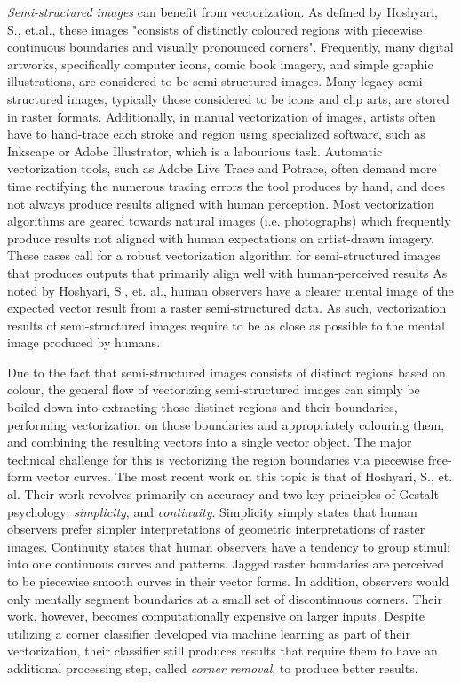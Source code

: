 \documentclass[12pt]{article}
\begin{document}
\textit{Semi-structured images} can benefit from vectorization. As defined by Hoshyari, S., et.al., these images "consists of distinctly coloured regions with piecewise continuous boundaries and visually pronounced corners". Frequently, many digital artworks, specifically computer icons, comic book imagery, and simple graphic illustrations, are considered to be semi-structured images. Many legacy semi-structured images, typically those considered to be icons and clip arts, are stored in raster formats\cite{hoshyari2018perceptiondriven}. Additionally, in manual vectorization of images, artists often have to hand-trace each stroke and region using specialized software, such as Inkscape or Adobe Illustrator, which is a labourious task\cite{matheson2018smoothing}. Automatic vectorization tools, such as Adobe Live Trace and Potrace, often demand more time rectifying the numerous tracing errors the tool produces by hand\cite{matheson2018smoothing}, and does not always produce results aligned with human perception\cite{hoshyari2018perceptiondriven}. Most vectorization algorithms are geared towards natural images (i.e. photographs) which frequently produce results not aligned with human expectations on artist-drawn imagery\cite{hoshyari2018perceptiondriven}. These cases call for a robust vectorization algorithm for semi-structured images that produces outputs that primarily align well with human-perceived results  As noted by Hoshyari, S., et. al., human observers have a clearer mental image of the expected vector result from a raster semi-structured data. As such, vectorization results of semi-structured images require to be as close as possible to the mental image produced by humans\cite{hoshyari2018perceptiondriven}.

Due to the fact that semi-structured images consists of distinct regions based on colour, the general flow of vectorizing semi-structured images can simply be boiled down into extracting those distinct regions and their boundaries, performing vectorization on those boundaries and appropriately colouring them, and combining the resulting vectors into a single vector object. The major technical challenge for this is vectorizing the region boundaries via piecewise free-form vector curves\cite{hoshyari2018perceptiondriven}. The most recent work on this topic is that of Hoshyari, S., et. al. Their work revolves primarily on accuracy and two key principles of Gestalt psychology: \textit{simplicity}, and \textit{continuity}. Simplicity simply states that human observers prefer simpler interpretations of geometric interpretations of raster images. Continuity states that human observers have a tendency to group stimuli into one continuous curves and patterns. Jagged raster boundaries are perceived to be piecewise smooth curves in their vector forms. In addition, observers would only mentally segment boundaries at a small set of discontinuous corners. Their work, however, becomes computationally expensive on larger inputs. Despite utilizing a corner classifier developed via machine learning as part of their vectorization, their classifier still produces results that require them to have an additional processing step, called \textit{corner removal}, to produce better results.
\end{document}
